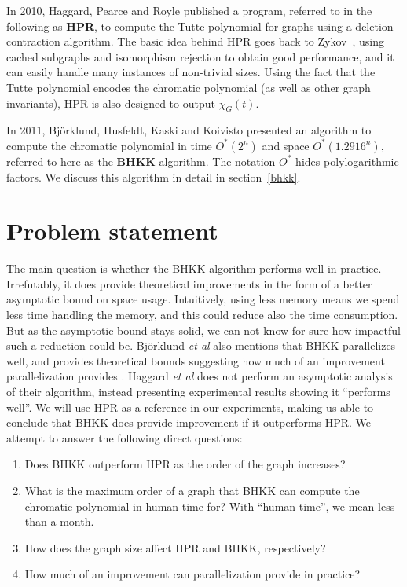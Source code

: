 \documentclass{cslthse-msc}
\begin{document}
In 2010, Haggard, Pearce and Royle \cite{haggard} published a program, referred to in the following as \textbf{HPR}, to compute the Tutte polynomial for graphs using a deletion-contraction algorithm. The basic idea behind HPR goes back to Zykov~\cite{aazykov}, using cached subgraphs and isomorphism rejection to obtain good performance, and it can easily handle many instances of non-trivial sizes. Using the fact that the Tutte polynomial encodes the chromatic polynomial (as well as other graph invariants), HPR is also designed to output $\chi_G(t)$.

In 2011, Björklund, Husfeldt, Kaski and Koivisto \cite{cov_pack} presented an algorithm to compute the chromatic polynomial in time $O^*(2^n)$ and space $O^*(1.2916^n)$, referred to here as the \textbf{BHKK} algorithm. The notation $O^*$ hides polylogarithmic factors. We discuss this algorithm in detail in section~\ref{bhkk}.

\section{Problem statement}
The main question is whether the BHKK algorithm performs well in practice. Irrefutably, it does provide theoretical improvements in the form of a better asymptotic bound on space usage. Intuitively, using less memory means we spend less time handling the memory, and this could reduce also the time consumption. But as the asymptotic bound stays solid, we can not know for sure how impactful such a reduction could be. Björklund \emph{et al} also mentions that BHKK parallelizes well, and provides theoretical bounds suggesting how much of an improvement parallelization provides \cite[p.10]{cov_pack}. Haggard \emph{et al} does not perform an asymptotic analysis of their algorithm, instead presenting experimental results showing it ``performs well''. We will use HPR as a reference in our experiments, making us able to conclude that BHKK does provide improvement if it outperforms HPR. We attempt to answer the following direct questions:

\begin{enumerate}
 \item Does BHKK outperform HPR as the order of the graph increases? \label{ngrow}
 \item What is the maximum order of a graph that BHKK can compute the chromatic polynomial in human time for? \label{maxn}
 \subitem With ``human time'', we mean less than a month.
 \item How does the graph size affect HPR and BHKK, respectively? \label{mgrow}
 \item How much of an improvement can parallelization provide in practice? \label{parallel}
\end{enumerate}
\end{document}
